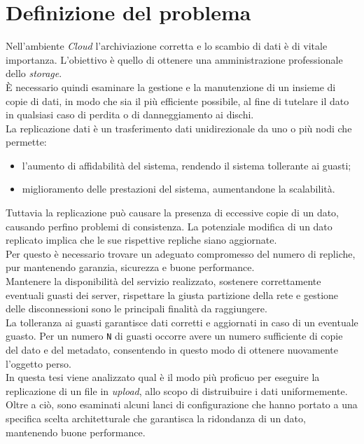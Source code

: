 \chapter{Definizione del problema}
\setcounter{section}{1}
Nell'ambiente \textit{Cloud} l'archiviazione corretta e lo scambio di dati \`{e} di vitale importanza. L'obiettivo \`{e} quello di ottenere una amministrazione professionale dello \textit{storage}.\\
\`{E} necessario quindi esaminare la gestione e la manutenzione di un insieme di copie di dati, in modo che sia il pi\`{u} efficiente possibile, al fine di tutelare il dato in qualsiasi caso di perdita o di danneggiamento ai dischi.\\

La replicazione dati \`{e} un trasferimento dati unidirezionale da uno o pi\`{u} nodi che permette:
\begin{itemize}
\item 
l'aumento di affidabilit\`{a} del sistema, rendendo il sistema tollerante ai guasti;
\item
miglioramento delle prestazioni del sistema, aumentandone la scalabilit\`{a}.
\end{itemize}

Tuttavia la replicazione pu\`{o} causare la presenza di eccessive copie di un dato, causando perfino problemi di consistenza. La potenziale modifica di un dato replicato implica che le sue rispettive repliche siano aggiornate. \\
Per questo \`{e} necessario trovare un adeguato compromesso del numero di repliche, pur mantenendo garanzia, sicurezza e buone performance.\\

Mantenere la disponibilit\`{a} del servizio realizzato, sostenere correttamente eventuali guasti dei server, rispettare la giusta partizione della rete e gestione delle disconnessioni sono le principali finalit\`{a} da raggiungere.\\
La tolleranza ai guasti garantisce dati corretti e aggiornati in caso di un eventuale guasto. Per un numero \verb"N" di guasti occorre avere un numero sufficiente di copie del dato e del metadato, consentendo in questo modo di ottenere nuovamente l'oggetto perso.\\

In questa tesi viene analizzato qual \`{e} il modo pi\`{u} proficuo per eseguire la replicazione di un file in \textit{upload}, allo scopo di distruibuire i dati uniformemente.\\ Oltre a ci\`{o}, sono esaminati alcuni lanci di configurazione che hanno portato a una specifica scelta architetturale che garantisca la ridondanza di un dato, mantenendo buone performance.

